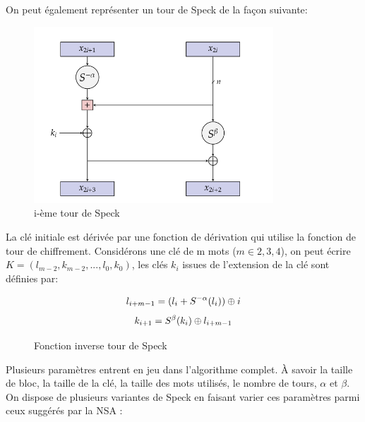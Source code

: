 		On peut également représenter un tour de Speck de la façon suivante:

		\begin{figure}[H]
			\centering
			\includegraphics[width=0.8\textwidth]{imgs/roundSpeck.png}
			\caption{i-ème tour de Speck}
		 	\label{roundSpeck}
		\end{figure}

		\vspace{0.3cm}

		La clé initiale est dérivée par une fonction de dérivation qui utilise la
		fonction de tour de chiffrement. Considérons une clé de m mots ($m\in {2,3,4}$),
		on peut écrire $ K = (l_{m-2},k_{m-2}, ..., l_0,k_0)$, les clés $k_i$ issues
		de l'extension de la clé sont définies par:

		\begin{figure}[H]
			\centering
			\[
				l_{i+m-1} = (l_i + S^{-\alpha}(l_i)) \mathbin{\oplus} i
			\]
			\[
				k_{i+1} = S^\beta (k_i) \mathbin{\oplus} l_{i+m-1}
			\]
			\caption{Fonction inverse tour de Speck}
			\label{tourSpeck}
		\end{figure}

			Plusieurs paramètres entrent en jeu dans l'algorithme complet. À savoir
		la taille de bloc, la taille de la clé, la taille des mots utilisés,
		le nombre de tours, $\alpha$ et $\beta$. On dispose de plusieurs variantes
		de Speck en faisant varier ces paramètres parmi ceux suggérés par la NSA \cite{speck_iot}:



		\vspace{0.5cm}

